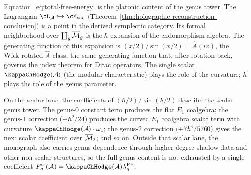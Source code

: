 \begin{remark}%
\label{rem:ahat-platonic}%
%
Equation~\eqref{eq:total-free-energy} is the platonic
content of the genus tower. The Lagrangian
$\cL_\cA \hookrightarrow \Mvac$
(Theorem~\ref{thm:holographic-reconstruction-conclusion})
is a point in the derived symplectic category. Its formal
neighborhood over $\coprod_g \overline{\mathcal{M}}_g$ is the
$\hbar$-expansion of the endomorphism algebra. The
generating function of this expansion is
$(x/2)/\sin(x/2) = \hat{A}(ix)$, the Wick-rotated
$\hat{A}$-class, the same generating function that,
after rotation back, governs the index theorem for
Dirac operators. The single scalar $\kappaChHodge(\cA)$ (the
modular characteristic) plays the role of the curvature;
$\hbar$ plays the role of the genus parameter.

On the scalar lane, the coefficients of
$(\hbar/2)/\sin(\hbar/2)$ describe the scalar genus tower.
The genus-$0$ constant term produces the flat $E_1$
coalgebra; the genus-$1$ correction ($+\hbar^2/24$) produces
the curved $E_1$ coalgebra scalar term with curvature
$\kappaChHodge(\cA) \cdot \omega_1$; the genus-$2$ correction
($+7\hbar^4/5760$) gives the next scalar coefficient over
$\overline{\mathcal{M}}_2$; and so on. Outside that scalar lane, the
monograph also carries genus dependence through
higher-degree shadow data and other non-scalar structures,
so the full genus content is not exhausted by a single
coefficient \(F_g^{\mathrm{sc}}(\cA)
=\kappaChHodge(\cA)\lambda_g^{\mathrm{FP}}\).
\end{remark}

